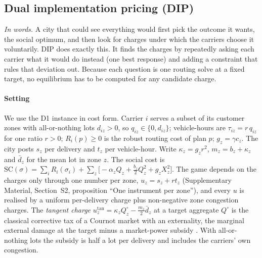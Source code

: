 \documentclass[preprint,11pt]{elsarticle}
\theoremstyle{definition}
\theoremstyle{remark}
\newcommand{\SM}[1]{Supplementary Material, Section~#1}
\begin{document}
\subsection{Dual implementation pricing (DIP)}\label{sec:dip}

\emph{In words.} A city that could see everything would first pick the outcome it wants, the social optimum, and then look for charges under which the carriers choose it voluntarily. DIP does exactly this. It finds the charges by repeatedly asking each carrier what it would do instead (one best response) and adding a constraint that rules that deviation out. Because each question is one routing solve at a fixed target, no equilibrium has to be computed for any candidate charge.

\paragraph{Setting} We use the D1 instance in cost form. Carrier $i$ serves a subset of its customer zones with all-or-nothing lots $d_{iz}>0$, so $q_{iz}\in\{0,d_{iz}\}$; vehicle-hours are $\tau_{iz}=r\,q_{iz}$ for one ratio $r>0$; $R_i(p)\ge0$ is the robust routing cost of plan $p$; $g_z=\gamma c_z$. The city posts $s_z$ per delivery and $t_z$ per vehicle-hour. Write $\kappa_z=g_zr^2$, $m_z=b_z+\kappa_z$ and $\bar d_z$ for the mean lot in zone $z$. The social cost is $\mathrm{SC}(\sigma)=\sum_iR_i(\sigma_i)+\sum_z\big[-\alpha_zQ_z+\tfrac{b_z}{2}Q_z^2+g_zX_z^2\big]$. The game depends on the charges only through one number per zone, $u_z=s_z+rt_z$ (\SM{S2}, proposition ``One instrument per zone''), and every $u$ is realised by a uniform per-delivery charge plus non-negative zone congestion charges. The \emph{tangent charge} $u^{\tan}_z=\kappa_zQ^\circ_z-\tfrac{m_z}{2}\bar d_z$ at a target aggregate $Q^\circ$ is the classical corrective tax of a Cournot market with an externality, the marginal external damage at the target minus a market-power subsidy \citep{Buchanan1969,Barnett1980}. With all-or-nothing lots the subsidy is half a lot per delivery and includes the carriers' own congestion.
\end{document}
